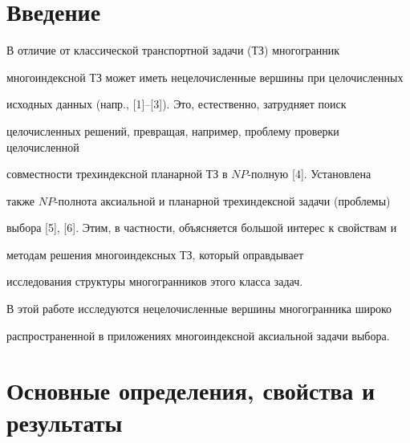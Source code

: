\pagestyle{plain} %







\maketitle


\label{begin}





\section{Введение}





В отличие от классической транспортной задачи (ТЗ) многогранник


многоиндексной ТЗ может иметь нецелочисленные вершины при целочисленных


исходных данных (напр., [1]--[3]). Это, естественно, затрудняет поиск


целочисленных решений, превращая, например, проблему проверки целочисленной


совместности трехиндексной планарной ТЗ в $NP$-полную [4]. Установлена


также $NP$-полнота аксиальной и планарной трехиндексной задачи (проблемы)


выбора [5], [6]. Этим, в частности, объясняется большой интерес к свойствам и


методам решения многоиндексных ТЗ, который оправдывает


исследования структуры многогранников этого класса задач.





В этой работе исследуются нецелочисленные вершины многогранника широко


распространенной в приложениях многоиндексной аксиальной задачи выбора.





\section{Основные определения, свойства и результаты}





